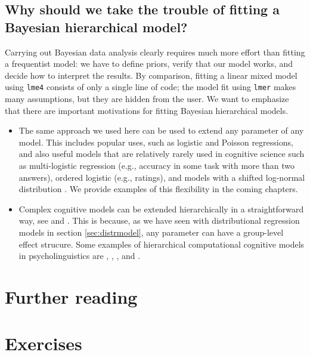 \documentclass[12pt,]{krantz}
\theoremstyle{definition}
\theoremstyle{definition}
\theoremstyle{definition}
\theoremstyle{remark}
\begin{document}
\subsection{Why should we take the trouble of fitting a Bayesian
hierarchical
model?}\label{why-should-we-take-the-trouble-of-fitting-a-bayesian-hierarchical-model}

Carrying out Bayesian data analysis clearly requires much more effort
than fitting a frequentist model: we have to define priors, verify that
our model works, and decide how to interpret the results. By comparison,
fitting a linear mixed model using \texttt{lme4} consists of only a
single line of code; the model fit using \texttt{lmer} makes many
assumptions, but they are hidden from the user. We want to emphasize
that there are important motivations for fitting Bayesian hierarchical
models.

\begin{itemize}
\item
  The same approach we used here can be used to extend any parameter of
  any model. This includes popular uses, such as logistic and Poisson
  regressions, and also useful models that are relatively rarely used in
  cognitive science such as multi-logistic regression (e.g., accuracy in
  some task with more than two answers), ordered logistic (e.g.,
  ratings), and models with a shifted log-normal distribution
  \citep[see][]{NicenboimEtAl2016Frontiersb, Rouder2005}. We provide
  examples of this flexibility in the coming chapters.
\item
  Complex cognitive models can be extended hierarchically in a
  straightforward way, see \citet{Lee2011} and
  \citet{LeeWagenmakers2014}. This is because, as we have seen with
  distributional regression models in section \ref{sec:distrmodel}, any
  parameter can have a group-level effect strucure. Some examples of
  hierarchical computational cognitive models in psycholinguistics are
  \citet{LogacevVasishth2015},
  \citet{nicenboimModelsRetrievalSentence2018},
  \citet{VasishthEtAl2017Modelling}, and
  \citet{VasishthEtAl2017Feature}.
\end{itemize}

\section{Further reading}\label{further-reading-4}

\section{Exercises}\label{exercises-3}
\end{document}
